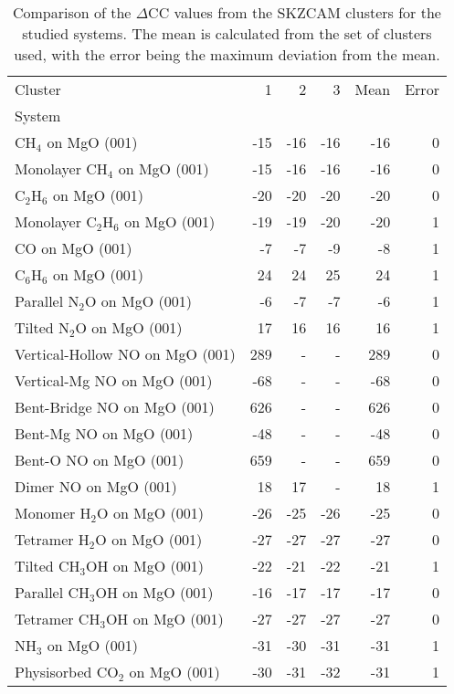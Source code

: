 \begin{table}
\caption{\label{tab:deltacc}Comparison of the $\Delta$CC values from the SKZCAM clusters for the studied systems. The mean is calculated from the set of clusters used, with the error being the maximum deviation from the mean.}
\begin{adjustbox}{center,max width=1\textwidth}
\begin{tabular}{lrrrrr}
\toprule
Cluster & 1 & 2 & 3 & Mean & Error \\ 
System &  &  &  &  &  \\
\midrule
CH$_4$ on MgO (001) & -15 & -16 & -16 & -16 & 0 \\
Monolayer CH$_4$ on MgO (001) & -15 & -16 & -16 & -16 & 0 \\
C$_2$H$_6$ on MgO (001) & -20 & -20 & -20 & -20 & 0 \\
Monolayer C$_2$H$_6$ on MgO (001) & -19 & -19 & -20 & -20 & 1 \\
CO on MgO (001) & -7 & -7 & -9 & -8 & 1 \\
C$_6$H$_6$ on MgO (001) & 24 & 24 & 25 & 24 & 1 \\
Parallel N$_2$O on MgO (001) & -6 & -7 & -7 & -6 & 1 \\
Tilted N$_2$O on MgO (001) & 17 & 16 & 16 & 16 & 1 \\
Vertical-Hollow NO on MgO (001) & 289 & - & - & 289 & 0 \\
Vertical-Mg NO on MgO (001) & -68 & - & - & -68 & 0 \\
Bent-Bridge NO on MgO (001) & 626 & - & - & 626 & 0 \\
Bent-Mg NO on MgO (001) & -48 & - & - & -48 & 0 \\
Bent-O NO on MgO (001) & 659 & - & - & 659 & 0 \\
Dimer NO on MgO (001) & 18 & 17 & - & 18 & 1 \\
Monomer H$_2$O on MgO (001) & -26 & -25 & -26 & -25 & 0 \\
Tetramer H$_2$O on MgO (001) & -27 & -27 & -27 & -27 & 0 \\
Tilted CH$_3$OH on MgO (001) & -22 & -21 & -22 & -21 & 1 \\
Parallel CH$_3$OH on MgO (001) & -16 & -17 & -17 & -17 & 0 \\
Tetramer CH$_3$OH on MgO (001) & -27 & -27 & -27 & -27 & 0 \\
NH$_3$ on MgO (001) & -31 & -30 & -31 & -31 & 1 \\
Physisorbed CO$_2$ on MgO (001) & -30 & -31 & -32 & -31 & 1 \\

\end{tabular}
\end{adjustbox}
\end{table}
